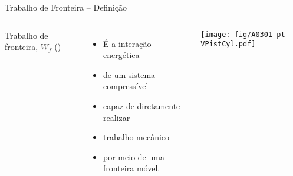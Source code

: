     \begin{frame}{Trabalho de Fronteira -- Definição}\vspace*{-2em}
        \begin{columns}
        Trabalho de fronteira, $W_f$ (\kilo\joule)                          \\[\medskipamount]
        \begin{itemize}
            \item É a \alert{interação  energética}                         \\[\medskipamount]
            \item de um \alert{sistema compressível}                        \\[\medskipamount]
            \item capaz de \alert{diretamente} realizar                     \\[\medskipamount]
            \item \alert{trabalho mecânico}                                 \\[\medskipamount]
            \item por meio de uma \alert{fronteira móvel}.
        \end{itemize}
        \texttt{[image: fig/A0301-pt-VPistCyl.pdf]}
        \end{columns}
    \end{frame}

